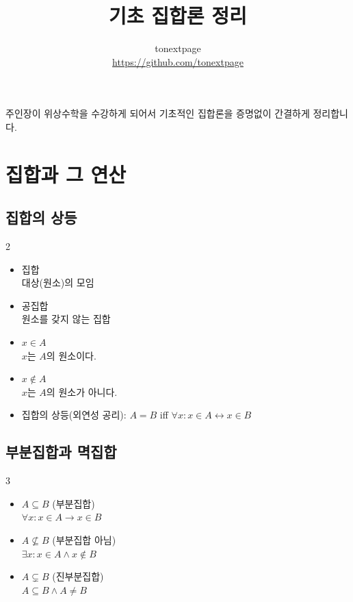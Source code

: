 \documentclass{article}
\title{기초 집합론 정리}
\author{tonextpage\\
    \url{https://github.com/tonextpage}
}
\date{}
\begin{document}
\maketitle

\noindent 주인장이 위상수학을 수강하게 되어서 기초적인 집합론을 증명없이 간결하게 정리합니다.

\tableofcontents
\newpage

\section{집합과 그 연산}
\subsection{집합의 상등}
\begin{multicols}{2}
\begin{itemize}
    \item 집합 \\
        대상(원소)의 모임
    \item 공집합 \\
        원소를 갖지 않는 집합
    \item $x\in A$ \\
        $x$는 $A$의 원소이다.
    \item $x\notin A$ \\
        $x$는 $A$의 원소가 아니다.
\end{itemize}
\end{multicols}

\begin{itemize}
    \item 집합의 상등(외연성 공리): $A=B$ iff $\forall x:x\in A\longleftrightarrow x\in B$
\end{itemize}

\subsection{부분집합과 멱집합}
\begin{multicols}{3}
\begin{itemize}
    \item $A\subseteq B$ (부분집합) \\
        $\forall x:x\in A\longrightarrow x\in B$
    \item $A\nsubseteq B$ (부분집합 아님) \\
        $\exists x:x\in A\wedge x\notin B$
    \item $A\subsetneq B$ (진부분집합) \\
        $A\subseteq B\wedge A\neq B$
\end{itemize}
\end{multicols}
\end{document}
